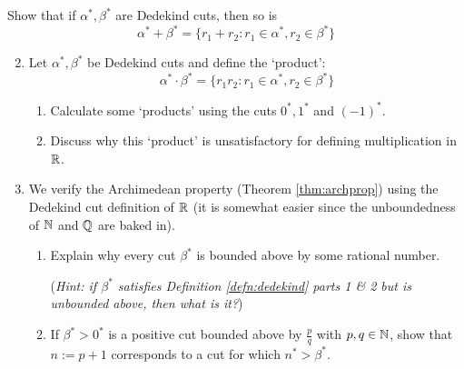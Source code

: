 \begin{exercises}{}{}
	\exstart %
  Show that if $\alpha^*,\beta^*$ are Dedekind cuts, then so is
  \[
  	\alpha^*+\beta^*=\{r_1+r_2:r_1\in\alpha^*,r_2\in\beta^*\}
  \]

	\begin{enumerate}\setcounter{enumi}{1}
	  \item %
	  Let $\alpha^*,\beta^*$ be Dedekind cuts and define the `product':
	  \[
	  	\alpha^*\cdot\beta^*=\{r_1r_2:r_1\in\alpha^*,r_2\in\beta^*\}
	  \]
	  \begin{enumerate}
	  	\item Calculate some `products' using the cuts $0^*,1^*$ and $(-1)^*$.
	  	\item Discuss why this `product' is unsatisfactory for defining multiplication in $\mathbb{R}$.
	  \end{enumerate}
	  
	  
	  \item We verify the Archimedean property (Theorem \ref{thm:archprop}) using the Dedekind cut definition of $\mathbb{R}$ (it is somewhat easier since the unboundedness of $\mathbb{N}$ and $\mathbb{Q}$ are baked in).
	  \begin{enumerate}
	    \item Explain why every cut $\beta^*$ is bounded above by some rational number.\par
	    (\emph{Hint: if $\beta^*$ satisfies Definition \ref{defn:dedekind} parts 1 \& 2 but is unbounded above, then what is it?})
	    \item If $\beta^*>0^*$ is a positive cut bounded above by $\frac pq$ with $p,q\in\mathbb{N}$, show that $n:=p+1$ corresponds to a cut for which $n^*>\beta^*$.
		\end{enumerate}
	\end{enumerate}
\end{exercises}